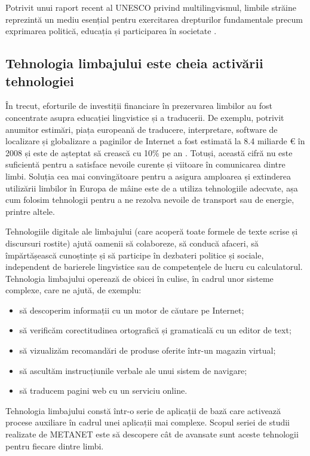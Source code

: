 \documentclass[]{../../metanetpaper}
\begin{document}
\begin{multicols}{2}
Potrivit unui raport recent al UNESCO privind multilingvismul, limbile străine reprezintă un mediu esențial pentru exercitarea drepturilor fundamentale precum exprimarea politică, educația și participarea în societate \cite{Unesco1}.

\subsection{Tehnologia limbajului este cheia activării tehnologiei}

În trecut, eforturile de investiții financiare în prezervarea limbilor au fost concentrate asupra educației lingvistice și a traducerii. De exemplu, potrivit anumitor estimări, piața europeană de traducere, interpretare, software de localizare și globalizare a paginilor de Internet a fost estimată la 8.4 miliarde € în 2008 și este de așteptat să crească cu 10\% pe an \cite{EC3}. Totuși, această cifră nu este suficientă pentru a satisface nevoile curente și viitoare în comunicarea dintre limbi. Soluția cea mai convingătoare pentru a asigura amploarea și extinderea utilizării limbilor în Europa de mâine este de a utiliza tehnologiile adecvate, așa cum folosim tehnologii pentru a ne rezolva nevoile de transport sau de energie, printre altele.

Tehnologiile digitale ale limbajului (care acoperă toate formele de texte scrise și discursuri rostite) ajută oamenii să colaboreze, să conducă afaceri, să împărtășească cunoștințe și să participe în dezbateri politice și sociale, independent de barierele lingvistice sau de competențele de lucru cu calculatorul. Tehnologia limbajului operează de obicei în culise, în cadrul unor sisteme complexe, care ne ajută, de exemplu:

\begin{itemize}
\item să descoperim informații cu un motor de căutare pe Internet;
\item să verificăm corectitudinea ortografică și gramaticală cu un editor de text;
\item să vizualizăm recomandări de produse oferite într-un magazin virtual;
\item să ascultăm instrucțiunile verbale ale unui sistem de navigare;
\item să traducem pagini web cu un serviciu online.
\end{itemize}

Tehnologia limbajului constă într-o serie de aplicații de bază care activează procese auxiliare în cadrul unei aplicații mai complexe. Scopul seriei de studii realizate de METANET este să descopere cât de avansate sunt aceste tehnologii pentru fiecare dintre limbi. 


\end{multicols}
\end{document}
